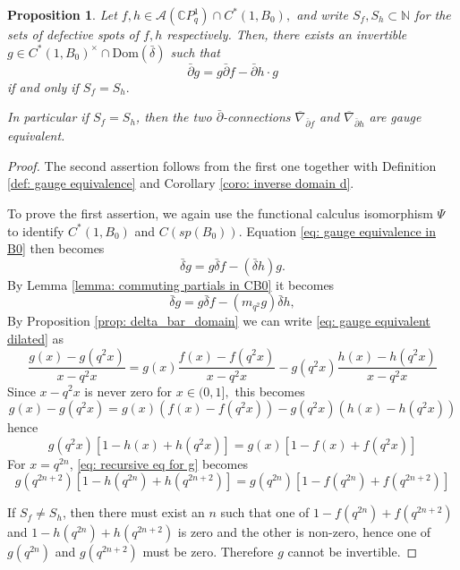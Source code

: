 \documentclass[12pt]{article}
\newtheorem{proposition}[definition]{Proposition}
\numberwithin{equation}{section}
\def\Dom{{\mathrm {Dom}}}
\def\pb{\bar{\partial}}
\def\db{\bar{\delta}}
\def\N{{\mathbb N}}
\def\C{{\mathbb C}}
\def\A{\mathcal{A}}
\def\d{\bar{\delta}}
\begin{document}
\begin{proposition}\label{prop: gauge equivalent between connections}
    Let $f, h \in \A(\C P^1_q)\cap C^*(1, B_0),$ and write $S_f, S_h \subset \N$ for the sets of defective spots of $f, h$ respectively. Then, there exists an invertible $g \in C^*(1, B_0)^{\times}\cap \Dom(\db)$ such that \begin{equation}\label{eq: gauge equivalence in B0}
    \pb g = g \pb f -\pb h \cdot g\end{equation} if and only if $S_f = S_h.$

    In particular if $S_f = S_h$, then the two $\pb$-connections $\overline{\nabla}_{\pb f}$ and $\overline{\nabla}_{\pb h}$  are gauge equivalent.
\end{proposition}
\begin{proof}
The second assertion follows from the first one together with  Definition \ref{def: gauge equivalence} and Corollary \ref{coro: inverse domain d}.

    To prove the first assertion, we again use the functional calculus isomorphism $\Psi$ to identify $C^*(1, B_0)$ and $C(sp(B_0))$. Equation \eqref{eq: gauge equivalence in B0} then becomes $$\d g = g \d f - (\d h) g.$$
    By Lemma \ref{lemma: commuting partials in CB0} it becomes 
    \begin{equation}\label{eq: gauge equivalent dilated}
    \d g = g \d f - (m_{q^2} g) \d h,
    \end{equation}
    By Proposition \ref{prop: delta_bar_domain}  we can write \eqref{eq: gauge equivalent dilated}  as \begin{equation}
    \frac{g(x) - g(q^2x)}{x - q^2x} = g(x) \frac{f(x) - f(q^2x)}{x - q^2x} - g(q^2x) \frac{h(x) - h(q^2x)}{x - q^2x}
    \end{equation}
    Since $x - q^2x$ is never zero for $x \in (0,1],$ this becomes \[
    g(x) - g(q^2x) = g(x) (f(x) - f(q^2x)) - g(q^2x) (h(x) - h(q^2x))
    \]
    hence \begin{equation}\label{eq: recursive eq for g}
    g(q^2x)[1 - h(x) + h(q^2x)] = g(x)[1 - f(x) + f(q^2x)]
    \end{equation}
    For $x=q^{2n}$, \eqref{eq: recursive eq for g} becomes
    \begin{equation}\label{eq: recursive eq for g 2}
    g(q^{2n+2})[1 - h(q^{2n}) + h(q^{2n+2})] = g(q^{2n})[1 - f(q^{2n}) + f(q^{2n+2})]
    \end{equation}

If $S_f\neq S_h$, then there must exist an $n$ such that one of $1 - f(q^{2n}) + f(q^{2n+2})$ and $1 - h(q^{2n}) + h(q^{2n+2})$ is zero and the other is non-zero, hence one of $g(q^{2n})$ and $g(q^{2n+2})$ must be zero. Therefore $g$ cannot be invertible.


\end{proof}
\end{document}
